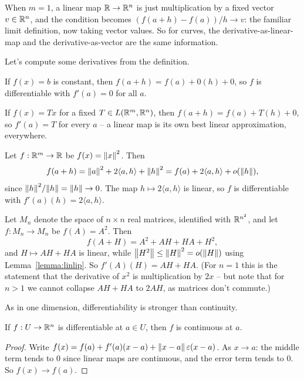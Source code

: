 \documentclass[a4paper]{scrartcl}
\begin{document}
\begin{remark}
    When $m = 1$, a linear map $\mathbb{R} \rightarrow \mathbb{R}^n$ is just multiplication by a fixed vector $v \in \mathbb{R}^n$, and the condition becomes $(f(a + h) - f(a))/h \rightarrow v$: the familiar limit definition, now taking vector values. So for curves, the derivative-as-linear-map and the derivative-as-vector are the same information.
\end{remark}

Let's compute some derivatives from the definition.

\begin{example}
    If $f(x) = b$ is constant, then $f(a + h) = f(a) + 0(h) + 0$, so $f$ is differentiable with $f'(a) = 0$ for all $a$.

    If $f(x) = Tx$ for a fixed $T \in L(\mathbb{R}^m, \mathbb{R}^n)$, then $f(a + h) = f(a) + T(h) + 0$, so $f'(a) = T$ for every $a$ -- a linear map is its own best linear approximation, everywhere.
\end{example}

\begin{example}
    Let $f: \mathbb{R}^m \rightarrow \mathbb{R}$ be $f(x) = \norm{x}^2$. Then
    $$
    f(a + h) = \norm{a}^2 + 2\langle a, h\rangle + \norm{h}^2 = f(a) + 2\langle a, h \rangle + o(\norm{h}),
    $$
    since $\norm{h}^2/\norm{h} = \norm{h} \rightarrow 0$. The map $h \mapsto 2\langle a, h\rangle$ is linear, so $f$ is differentiable with $f'(a)(h) = 2\langle a, h\rangle$.
\end{example}

\begin{example}
    Let $M_n$ denote the space of $n \times n$ real matrices, identified with $\mathbb{R}^{n^2}$, and let $f: M_n \rightarrow M_n$ be $f(A) = A^2$. Then
    $$
    f(A + H) = A^2 + AH + HA + H^2,
    $$
    and $H \mapsto AH + HA$ is linear, while $\norm{H^2} \leq \norm{H}^2 = o(\norm{H})$ using Lemma~\ref{lemma:linlip}. So $f'(A)(H) = AH + HA$. (For $n = 1$ this is the statement that the derivative of $x^2$ is multiplication by $2x$ -- but note that for $n > 1$ we cannot collapse $AH + HA$ to $2AH$, as matrices don't commute.)
\end{example}

As in one dimension, differentiability is stronger than continuity.

\begin{proposition}
    If $f: U \rightarrow \mathbb{R}^n$ is differentiable at $a \in U$, then $f$ is continuous at $a$.
\end{proposition}
\begin{proof}
    Write $f(x) = f(a) + f'(a)(x - a) + \norm{x - a}\,\varepsilon(x - a)$. As $x \rightarrow a$: the middle term tends to $0$ since linear maps are continuous, and the error term tends to $0$. So $f(x) \rightarrow f(a)$.
\end{proof}
\end{document}
